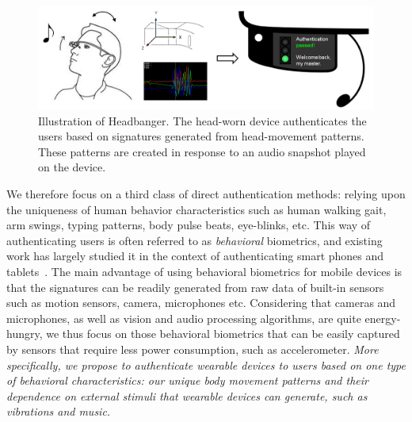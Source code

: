 \begin{figure}[t!]
\centering
\includegraphics[width=\columnwidth]{figure/headbanger_illustrate.png}
\caption{Illustration of Headbanger. The head-worn device authenticates the
users based on signatures generated from head-movement patterns.  These patterns are created in
response to an audio snapshot played on the device.}
\label{fig:headbanger-illustrate}
\end{figure}

We therefore focus on a third class of direct authentication methods: relying upon the uniqueness of human behavior characteristics such as human walking gait, arm swings, typing patterns, body pulse beats, eye-blinks, etc. This way of authenticating users is often referred to as \emph{behavioral} biometrics, and existing work has largely studied it in the context of authenticating smart phones and tablets~\cite{rahman2014bodybeat,cornelius2014wearable,stevenage1999visual,okumura2006study,monrose2000keystroke,jorgensen2011mouse,bo2013silentsense,de2012touch}. The main advantage of using behavioral biometrics for mobile devices is that the signatures can be readily generated from raw data of built-in sensors such as motion sensors, camera, microphones etc. Considering that cameras and microphones, as well as vision and audio processing algorithms, are quite energy-hungry, we thus focus on those behavioral biometrics that can be easily captured by sensors that require less power consumption, such as accelerometer. \emph{More specifically, we propose to authenticate wearable devices to users based on one type of behavioral characteristics: our unique body movement patterns and their dependence on external stimuli that wearable devices can generate, such as vibrations and music.}

